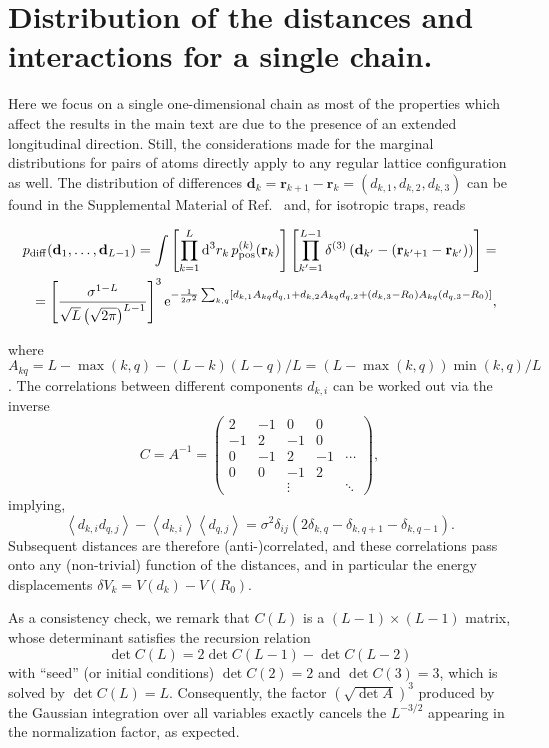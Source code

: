 \documentclass[prl,aps,twocolumn,showpacs,superscriptaddress,longbibliography]{revtex4-1}
\newcommand{\be}{\begin{equation}}
\newcommand{\ee}{\end{equation}}
\newcommand{\matb}{\left(\begin{array}}
\newcommand{\mate}{\end{array}\right)}
\newcommand{\rmd}{{\rm{d}}}
\newcommand{\rme}[1]{{\rm{e}}^{#1}}
\newcommand{\lt}{\left(}
\newcommand{\rt}{\right)}
\newcommand{\lqq}{\left[}
\newcommand{\rqq}{\right]}
\newcommand{\lan}{\left\langle}
\newcommand{\ran}{\right\rangle}
\newcommand{\av}[1]{\lan #1 \ran}
\newcommand{\prodl}[2]{\prod\limits_{#1}^{#2}}
\begin{document}
\section{Distribution of the distances and interactions for a single chain.} 
Here we focus on a single one-dimensional chain as most of the properties which affect the results in the main text are due to the presence of an extended longitudinal direction. Still, the considerations made for the marginal distributions for pairs of atoms directly apply to any regular lattice configuration as well.
The distribution of differences $\mathbf{d}_k = \mathbf{r}_{k+1} - \mathbf{r}_k = (d_{k,1}, d_{k,2}, d_{k,3})$ can be found in the Supplemental Material of Ref.~\cite{a_Marcuzzi_PRL_17} and, for isotropic traps, reads
\begin{widetext}
\be
\begin{split}
	p_{\rm diff}(\mathbf{d}_1 , \ldots , \mathbf{d}_{L-1}) = \int \lqq \prodl{k=1}{L} \rmd^3 r_k \, p^{(k)}_{\rm pos}(\mathbf{r}_k) \rqq  
	\lqq  \prodl{k'=1}{L-1} \delta^{(3)} \lt  \mathbf{d}_{k'} - \lt \mathbf{r}_{k'+1} - \mathbf{r}_{k'} \rt  \rt \rqq = \\
	= \lqq  \frac{\sigma^{1-L}}{\sqrt{L} \lt \sqrt{2\pi } \rt^{L-1}}  \rqq^3    \rme{- \frac{1}{2\sigma^2} \sum_{k,q} \lqq   d_{k,1} A_{kq} d_{q,1}  +   d_{k,2} A_{kq} d_{q,2}  +  (d_{k,3} - R_0) A_{kq} (d_{q,3} - R_0)  \rqq } ,   
	\label{eq:pdiff}
\end{split}
\ee
\end{widetext}
where $A_{kq} = L - \max(k,q) - (L-k)(L-q)/L = (L - \max(k,q)) \min(k,q) / L$. The correlations between different components $d_{k,i}$ can be worked out via the inverse \cite{MatInverse}
\be
C = A^{-1} =   \matb{ccccc}    
	2 & -1 & 0 & 0 &   \\
	-1 & 2 & -1 & 0 &   \\
	0 & -1 & 2 & -1 &  \cdots  \\
	0 & 0 & -1 & 2 &    \\
	  &   &  \vdots &    & \ddots
\mate,
\label{eq:matC}
\ee
implying, 
\be
	\av{d_{k,i} d_{q,j}} - \av{d_{k,i}} \av{ d_{q,j}} = \sigma^2 \delta_{ij} \lt  2 \delta_{k,q} - \delta_{k,q+1} - \delta_{k,q-1}  \rt.
\ee
Subsequent distances are therefore (anti-)correlated, and these correlations pass onto any (non-trivial) function of the distances, and in particular the energy displacements $\delta V_k = V(d_k) - V(R_0)$.

As a consistency check, we remark that $C(L)$ is a $(L-1)\times (L-1)$ matrix, whose determinant satisfies the recursion relation
\be
	\det C(L) = 2\det C(L-1) - \det C(L-2) 
\ee
with ``seed'' (or initial conditions) $\det C(2) = 2$ and $\det C(3) = 3$, which is solved by $\det C(L) = L$. Consequently, the factor $\lt \sqrt{\det A} \rt^3$ produced by the Gaussian integration over all variables exactly cancels the $L^{-3/2}$ appearing in the normalization factor, as expected.
\end{document}
